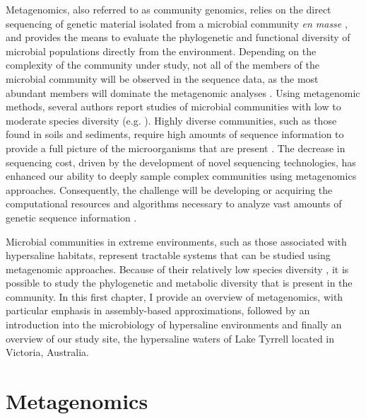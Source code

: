     Metagenomics, also referred to as community genomics, relies on the direct sequencing of genetic material isolated from a microbial community \textit{en masse} \cite{Wooley:2010uv}, and provides the means to evaluate the phylogenetic and functional diversity of microbial populations directly from the environment. Depending on the complexity of the community under study, not all of the members of the microbial community will be observed in the sequence data, as the most abundant members will dominate the metagenomic analyses \cite{Bragg:2014kv}. Using metagenomic methods, several authors report studies of microbial communities with low to moderate species diversity  (e.g. \cite{Ugalde:2013he,Podell:2013kx,Dinsdale:2008cd,Tyson:2004bw,Brulc:2009fi}). Highly diverse communities, such as those found in soils and sediments, require high amounts of sequence information to provide a full picture of the microorganisms that are present \cite{Kakirde:2010ew}. The decrease in sequencing cost, driven by the development of novel sequencing technologies, has enhanced our ability to deeply sample complex communities using metagenomics approaches. Consequently, the challenge will be developing or acquiring the computational resources and algorithms necessary to analyze vast amounts of genetic sequence information  \cite{Pell:2012id,Kakirde:2010ew}. 
    
    Microbial communities in extreme environments, such as those associated with hypersaline habitats, represent tractable systems that can be studied using metagenomic approaches. Because of their relatively low species diversity  \cite{Andrei:2012he,Podell:2013kx,Ghai:2011hn}, it is possible to study the phylogenetic and metabolic diversity that is present in the community. In this first chapter, I provide an overview of metagenomics, with particular emphasis in assembly-based approximations, followed by an introduction into the microbiology of hypersaline environments and finally an overview of our study site, the hypersaline waters of Lake Tyrrell located in Victoria, Australia.

\section{Metagenomics}

